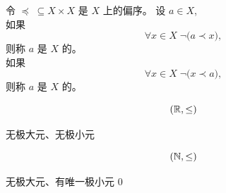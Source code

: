 
\begin{frame}{}
  \begin{definition}
    令 $\preceq \;\subseteq X \times X$ 是 $X$ 上的偏序。
    设 $a \in X$,\\[5pt]

    \pause
    如果
    \[
      \forall x \in X\; \lnot \big(a \prec x \big),
    \]
    则称 $a$ 是 $X$ 的。\\[10pt]

    \pause
    如果
    \[
      \forall x \in X\; \lnot \big(x \prec a \big),
    \]
    则称 $a$ 是 $X$ 的。
  \end{definition}

  \pause
  \vspace{0.30cm}
  \begin{center}
  \end{center}
\end{frame}

\begin{frame}{}
  \begin{exampleblock}{}
    \[
      (\mathbb{R}, \le)
    \]
    \pause
    \begin{center}
      无极大元、无极小元
    \end{center}
  \end{exampleblock}

  \pause
  \vspace{0.30cm}
  \begin{exampleblock}{}
    \[
      (\mathbb{N}, \le)
    \]
    \pause
    \begin{center}
      无极大元、有唯一极小元 $0$
    \end{center}
  \end{exampleblock}
\end{frame}

\begin{frame}{}
  \begin{center}
  \end{center}
\end{frame}

\begin{frame}{}
\end{frame}

